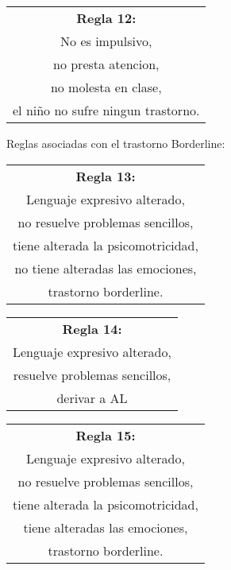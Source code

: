 \documentclass[letterpaper,12pt]{article}
\begin{document}
\begin{center}
	\begin{tabular}{|c|}
		\hline 
		\textbf{Regla 12:} \\
		No es impulsivo,\\
		no presta atencion,\\
		no molesta en clase,\\
		el niño no sufre ningun trastorno. \\
		\hline 
		\end{tabular} 
	\end{center}
Reglas asociadas con el trastorno Borderline:
\begin{center}
	\begin{tabular}{|c|}
		\hline 
		\textbf{Regla 13:} \\
		Lenguaje expresivo alterado, \\
		no resuelve problemas sencillos, \\
		tiene alterada la psicomotricidad, \\
		no tiene alteradas las emociones, \\
		trastorno borderline. \\
		\hline 
	\end{tabular} 
\end{center}

\begin{center}
	\begin{tabular}{|c|}
		\hline 
		\textbf{Regla 14:} \\
		Lenguaje expresivo alterado, \\
 		resuelve problemas sencillos, \\
		derivar a AL \\
		\hline 
		\end{tabular} 
	\end{center}

\begin{center}
	\begin{tabular}{|c|}
		\hline 
		\textbf{Regla 15:} \\
		Lenguaje expresivo alterado, \\
		no resuelve problemas sencillos, \\
		tiene alterada la psicomotricidad, \\
		tiene alteradas las emociones, \\
		trastorno borderline. \\
		\hline 
\end{tabular} 
\end{center}
\end{document}
